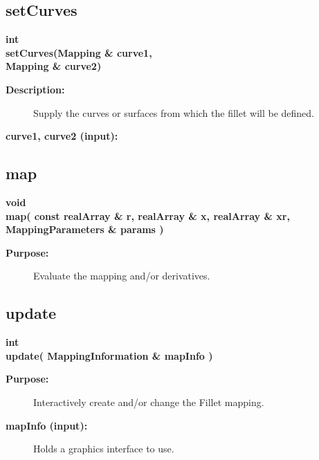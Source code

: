 \subsection{setCurves}
 
\newlength{\FilletMappingIncludeArgIndent}
\begin{flushleft} \textbf{%
int  \\ 
\settowidth{\FilletMappingIncludeArgIndent}{setCurves(}%
setCurves(Mapping \& curve1, \\ 
\hspace{\FilletMappingIncludeArgIndent}Mapping \& curve2)
}\end{flushleft}
\begin{description}
\item[{\bf Description:}]  Supply the curves or surfaces from which the fillet will be defined.
\item[{\bf curve1, curve2 (input):}]  
\end{description}
\subsection{map}
 
\begin{flushleft} \textbf{%
void  \\ 
\settowidth{\FilletMappingIncludeArgIndent}{map(}%
map( const realArray \& r, realArray \& x, realArray \& xr, MappingParameters \& params )
}\end{flushleft}
\begin{description}
\item[{\bf Purpose:}]  Evaluate the mapping and/or derivatives. 
\end{description}
\subsection{update}
 
\begin{flushleft} \textbf{%
int  \\ 
\settowidth{\FilletMappingIncludeArgIndent}{update(}%
update( MappingInformation \& mapInfo ) 
}\end{flushleft}
\begin{description}
\item[{\bf Purpose:}]  Interactively create and/or change the Fillet mapping.
\item[{\bf mapInfo (input):}]  Holds a graphics interface to use.
\end{description}

